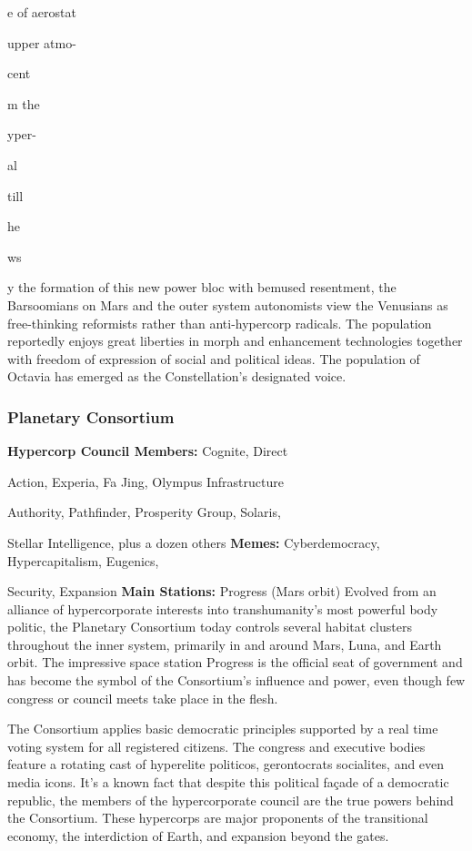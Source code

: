 e of aerostat

upper atmo-

cent 

m the 

yper-

al

till

he

ws

y
the formation of this new power bloc with bemused 
resentment, the Barsoomians on Mars and the outer 
system autonomists view the Venusians as free-thinking
reformists rather than anti-hypercorp radicals. The
population reportedly enjoys great liberties in morph 
and enhancement technologies together with freedom 
of expression of social and political ideas. The population
of Octavia has emerged as the Constellation's
designated voice.

\subsubsection{Planetary Consortium}

\textbf{Hypercorp Council Members:} Cognite, Direct 

Action, Experia, Fa Jing, Olympus Infrastructure 

Authority, Pathfinder, Prosperity Group, Solaris, 

Stellar Intelligence, plus a dozen others
\textbf{Memes:} Cyberdemocracy, Hypercapitalism, Eugenics, 

Security, Expansion
\textbf{Main Stations:} Progress (Mars orbit)
Evolved from an alliance of hypercorporate interests 
into transhumanity's most powerful body politic, the 
Planetary Consortium today controls several habitat 
clusters throughout the inner system, primarily in and 
around Mars, Luna, and Earth orbit. The impressive 
space station Progress is the official seat of government
and has become the symbol of the Consortium's
influence and power, even though few congress or 
council meets take place in the flesh.

The Consortium applies basic democratic principles 
supported by a real time voting system for all registered
citizens. The congress and executive bodies
feature a rotating cast of hyperelite politicos, gerontocrats
socialites, and even media icons. It's a known
fact that despite this political façade of a democratic 
republic, the members of the hypercorporate council 
are the true powers behind the Consortium. These 
hypercorps are major proponents of the transitional 
economy, the interdiction of Earth, and expansion 
beyond the gates.

